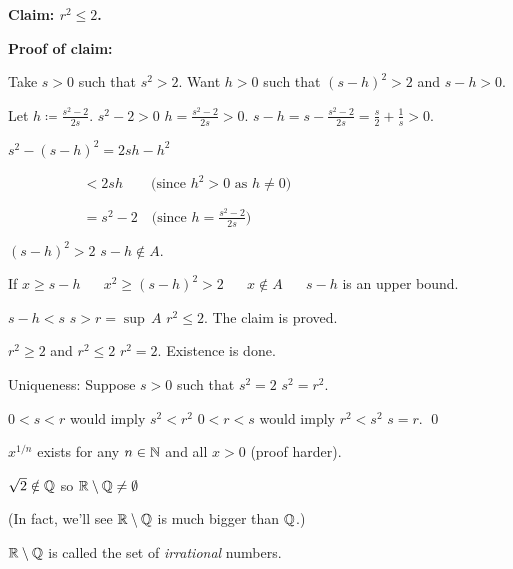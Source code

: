 \documentclass[10pt,aspectratio=169]{beamer}
\begin{document}
\begin{frame}
\textbf{Claim: $r^2 \leq 2$.}

\medskip
\pause

\textbf{Proof of claim:}

Take $s > 0$ such that $s^2 > 2$.
\pause
\quad
Want $h > 0$ such that ${(s-h)}^2 > 2$ and $s-h > 0$.

\medskip
\pause

Let $h \coloneqq \frac{s^2-2}{2s}$.
\pause
\qquad
$s^2-2 > 0$ \wthus $h = \frac{s^2-2}{2s} > 0$.
\qquad
\pause
$s-h=s-\frac{s^2-2}{2s} = \frac{s}{2}+\frac{1}{s} > 0$.

\medskip
\pause

$\displaystyle
s^2 - {(s-h)}^2 = 2sh - h^2
$

\medskip
\pause

$\displaystyle
\,\, \quad \qquad \qquad
  < 2sh \qquad \bigl( \text{since } h^2 > 0 \text{ as } h \not= 0 \bigr)
$

\medskip
\pause

$\displaystyle
\,\, \quad \qquad \qquad
  = s^2-2 \quad \bigl( \text{since } h = \tfrac{s^2-2}{2s} \bigr)
$

\medskip
\pause

\thus \quad ${(s-h)}^2 > 2$
\pause
\wthus
$s-h \notin A$.

\medskip
\pause

If
$x \geq s-h$ ~\thus~ $x^2 \geq {(s-h)}^2 > 2$ %
\pause
~\thus~ $x \notin A$
\pause
~\thus~ $s-h$ is an upper bound.

\medskip
\pause

$s-h < s$ \wthus $s > r = \sup \, A$ \wthus $r^2 \leq 2$.
\qquad
\pause
The claim is proved.

\medskip
\pause

$r^2 \geq 2$ and $r^2 \leq 2$ \wthus $r^2 = 2$.
\pause
\quad Existence is done.

\medskip
\pause

Uniqueness: 
Suppose $s > 0$ such that $s^2=2$
\pause
\wthus
$s^2=r^2$.

\medskip
\pause

$0 < s < r$ would imply $s^2 < r^2$
\pause
\quad
$0 < r < s$ would imply $r^2 < s^2$
\pause
\wthus $s=r$.
\qed
\end{frame}

\begin{frame}
$x^{1/n}$ exists for any $n \in {\mathbb{N}}$ and all $x > 0$ (proof harder).

\medskip
\pause

$\sqrt{2} \notin {\mathbb{Q}}$
\qquad
\pause
so
${\mathbb{R}} \setminus {\mathbb{Q}} \not= \emptyset$

\pause
(In fact, we'll see ${\mathbb{R}} \setminus {\mathbb{Q}}$ is much bigger than ${\mathbb{Q}}$.)

\medskip
\pause

${\mathbb{R}} \setminus {\mathbb{Q}}$ is called the set of \emph{irrational} numbers.


\end{frame}
\end{document}
